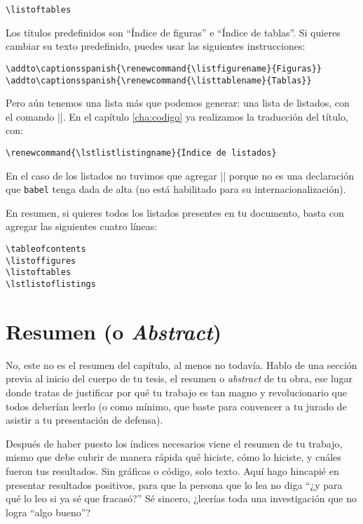 \begin{lstlisting}[style=latex]
\listoftables
\end{lstlisting}

Los títulos predefinidos son ``Índice de figuras'' e ``Índice de tablas''. Si quieres cambiar su texto predefinido, puedes usar las siguientes instrucciones:

\begin{lstlisting}[style=latex]
\addto\captionsspanish{\renewcommand{\listfigurename}{Figuras}}
\addto\captionsspanish{\renewcommand{\listtablename}{Tablas}}
\end{lstlisting}

Pero aún tenemos una lista más que podemos generar: una lista de listados, con el comando |\lstlistoflistings|. En el capítulo \ref{cha:codigo} ya realizamos la traducción del título, con:

\begin{lstlisting}[style=latex]
\renewcommand{\lstlistlistingname}{Índice de listados}
\end{lstlisting}

En el caso de los listados no tuvimos que agregar |\addto\captionsspanish| porque no es una declaración que \texttt{babel} tenga dada de alta (no está habilitado para su internacionalización).

En resumen, si quieres todos los listados presentes en tu documento, basta con agregar las siguientes cuatro líneas:

\begin{lstlisting}[style=latex]
\tableofcontents
\listoffigures
\listoftables
\lstlistoflistings
\end{lstlisting}



\section{Resumen (o \emph{Abstract})}



No, este no es el resumen del capítulo, al menos no todavía. Hablo de una sección previa al inicio del cuerpo de tu tesis, el resumen o \emph{abstract} de tu obra, ese lugar donde tratas de justificar por qué tu trabajo es tan magno y revolucionario que todos deberían leerlo (o como mínimo, que baste para convencer a tu jurado de asistir a tu presentación de defensa).

Después de haber puesto los índices necesarios viene el resumen de tu trabajo, mismo que debe cubrir de manera rápida qué hiciste, cómo lo hiciste, y cuáles fueron tus resultados. Sin gráficas o código, solo texto. Aquí hago hincapié en presentar resultados positivos, para que la persona que lo lea no diga ``¿y para qué lo leo si ya sé que fracasó?'' Sé sincero, ¿leerías toda una investigación que no logra ``algo bueno''?


